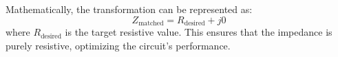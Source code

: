 Mathematically, the transformation can be represented as:
\[
Z_{\text{matched}} = R_{\text{desired}} + j0
\]
where \( R_{\text{desired}} \) is the target resistive value. This ensures that the impedance is purely resistive, optimizing the circuit's performance.

